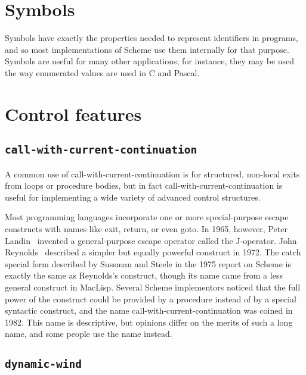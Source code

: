 \documentclass[twoside,twocolumn]{algol60}
\begin{document}
\section{Symbols}

Symbols have exactly the properties needed to represent
identifiers in programs, and so most implementations
of Scheme use them internally for that purpose.  Symbols are useful
for many other applications; for instance, they may be used the way
enumerated values are used in C and Pascal.

\section{Control features}

\subsection{{\tt call-with-current-continuation}}

\vest A common use of {\cf call-with-current-continuation} is for
structured, non-local exits from loops or procedure bodies, but in fact
{\cf call-with-current-continuation} is useful for implementing a
wide variety of advanced control structures.

Most programming languages incorporate one or more special-purpose
escape constructs with names like {\cf exit}, \hbox{{\cf return}}, or
even {\cf goto}.  In 1965, however, Peter Landin~\cite{Landin65}
invented a general-purpose escape operator called the J-operator.  John
Reynolds~\cite{Reynolds72} described a simpler but equally powerful
construct in 1972.  The {\cf catch} special form described by Sussman
and Steele in the 1975 report on Scheme is exactly the same as
Reynolds's construct, though its name came from a less general construct
in MacLisp.  Several Scheme implementors noticed that the full power of the
 construct could be provided by a procedure instead of by a
special syntactic construct, and the name
{\cf call-with-current-continuation} was coined in 1982.  This name is
descriptive, but opinions differ on the merits of such a long name, and
some people use the name  instead.

\subsection{{\tt dynamic-wind}}
\end{document}
